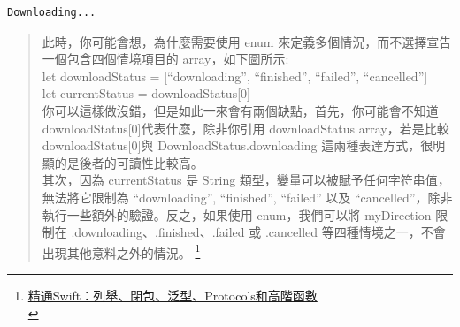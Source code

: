 \documentclass[a4paper,12pt]{article}
\begin{document}
\begin{verbatim}
Downloading...
\end{verbatim}


\begin{verse}
此時，你可能會想，為什麼需要使用 enum 來定義多個情況，而不選擇宣告一個包含四個情境項目的 array，如下圖所示:\\
\vspace*{1em}
let downloadStatus = [“downloading”, “finished”, “failed”, “cancelled”]\\
let currentStatus = downloadStatus[0]\\
\vspace*{1em}
你可以這樣做沒錯，但是如此一來會有兩個缺點，首先，你可能會不知道 downloadStatus[0]代表什麼，除非你引用 downloadStatus array，若是比較 downloadStatus[0]與 DownloadStatus.downloading 這兩種表達方式，很明顯的是後者的可讀性比較高。\\
\vspace*{1em}
其次，因為 currentStatus 是 String 類型，變量可以被賦予任何字符串值，無法將它限制為 “downloading”, “finished”, “failed” 以及 “cancelled”，除非執行一些額外的驗證。反之，如果使用 enum，我們可以將 myDirection 限制在 .downloading、.finished、.failed 或 .cancelled 等四種情境之一，不會出現其他意料之外的情況。 \footnote{\href{https://appcoda.com.tw/mastering-swift/}{精通Swift：列舉、閉包、泛型、Protocols和高階函數}\\}\\
\end{verse}
\end{document}
